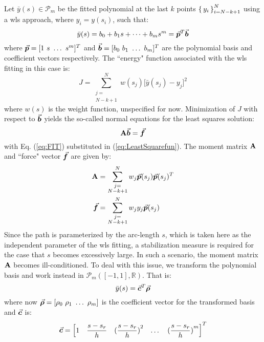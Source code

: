 Let $\bar{y}(s)\in\mathcal{P}_m$ be the fitted polynomial at the last $k$ points
$\set{y_i}_{i=N-k+1}^N$ using a \acrshort{wls} approach, where $y_i=y(s_i)$, 
such that:
\begin{equation}
	\bar{y}(s) = b_0+b_1s+\cdots +b_ms^m=\vec{\bm{p}}^T\vec{\bm{b}}
	\label{eq:FIT}
\end{equation}
where $\vec{\bm{p}}=[1\ s\ \dots\ s^m]^T$ and $\vec{\bm{b}}=[b_0\ b_1\ \dots\ b_m]^T$ 
are the polynomial basis and coefficient vectors respectively. 
The ``energy" function associated with the \acrshort{wls} fitting in this case 
is:
\begin{equation}
	J = \sum_{\substack{j=\\ N-k+1}}^N w(s_j)\bigg[\bar{y}(s_j)-y_j\bigg]^2
	\label{eq:LeastSquarefun}
\end{equation}
where $w(s)$ is the weight function, unspecified for now. Minimization of $J$ 
with respect to $\vec{\bm{b}}$ yields the so-called normal equations for the least
squares solution: 
\begin{equation}
	\mathbf{A}\vec{\bm{b}}=\vec{\bm{f}}
	\label{eq:NORMAL}
\end{equation}
with Eq. (\ref{eq:FIT}) substituted in (\ref{eq:LeastSquarefun}). The moment
matrix $\mathbf{A}$ and ``force" vector $\vec{\bm{f}}$ are given by:
\begin{subequations}
	\begin{align}
		\mathbf{A} &= \sum_{\substack{j=\\ N-k+1}}^N 
		w_j\vec{\bm{p}}(s_j)\vec{\bm{p}}(s_j)^T\label{eq:moment}\\ 
		\vec{\bm{f}} &= \sum_{\substack{j=\\ N-k+1}}^N 
		w_jy_j\vec{\bm{p}}(s_j)\label{eq:force}
	\end{align}
	\label{eq:MOMENTEQS}
\end{subequations}
Since the path is
parameterized by the arc-length $s$, which is taken here as the independent
parameter of the \acrshort{wls} fitting, a stabilization measure is required 
for the case
that $s$ becomes excessively large. In such a scenario, the moment matrix
$\mathbf{A}$ becomes ill-conditioned. To deal with this issue, we transform the 
polynomial basis and work instead in $\mathcal{P}_m([-1,1],\mathbb{R})$. 
That is:
\begin{equation}
	\bar{y}(s) = \vec{\bm{c}}^T\vec{\bm{\rho}}
	\label{eq:TFIT}
\end{equation}
where now $\vec{\bm{\rho}}=[\rho_0\ \rho_1\ \dots\ \rho_m]$ is the coefficient 
vector for the
transformed basis and $\vec{\bm{c}}$ is:
\begin{equation}
	\vec{\bm{c}} = \begin{bmatrix}
		1 & \dfrac{s-s_r}{h} & (\dfrac{s-s_r}{h})\strut^2 & \dots &
		(\dfrac{s-s_r}{h})\strut^m
	\end{bmatrix}^T
	\label{eq:TPOLYBASIS}
\end{equation}
